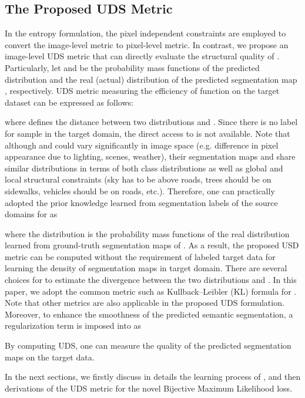 \documentclass[10pt,twocolumn,letterpaper]{article}
\begin{document}
\subsection{The Proposed UDS Metric}










In the entropy formulation, the pixel independent constraints are employed to convert the image-level metric to pixel-level metric. In contrast,
we propose an image-level UDS metric that can directly evaluate the structural quality of . 
Particularly, let  and  be the probability mass functions of the predicted distribution and the real (actual) distribution of the predicted segmentation map , respectively.
UDS metric measuring the efficiency of function  on the target dataset can be expressed as follows:

where 
 defines the distance between two distributions  and . Since there is no label for sample in the target domain, the direct access to  is not available. 
Note that although  and  could vary significantly in image space (e.g. difference in pixel appearance due to lighting, scenes, weather), their segmentation maps  and  share similar distributions in terms of both class distributions as well as global and local structural constraints (sky has to be above roads, trees should be on sidewalks, vehicles should be on roads, etc.). 
Therefore, one can practically adopted the prior knowledge learned from segmentation labels of the source domains for  as

where the distribution  
is the probability mass functions of the real distribution learned from ground-truth segmentation maps of . As a result, the proposed USD metric can be computed without the requirement of labeled target data for learning the density of segmentation maps in target domain. 
There are several choices for  to estimate the divergence between the two distributions  and . In this paper, we adopt the common metric such as  Kullback–Leibler (KL) formula for . 
Note that other metrics are also applicable in the proposed UDS formulation.
Moreover, to enhance the smoothness of the predicted semantic segmentation, a regularization term  is imposed into  as

By computing UDS, one can measure the quality of the predicted segmentation maps  on the target data. 

In the next sections, we firstly discuss in details the learning process of , and then derivations of the UDS metric for the novel Bijective Maximum Likelihood loss. 
\end{document}
